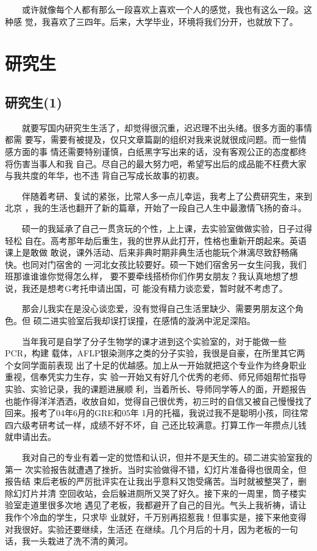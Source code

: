 \documentclass[12pt]{book}
\begin{document}
　　或许就像每个人都有那么一段喜欢上喜欢一个人的感觉，我也有这么一段。这种感
觉，我喜欢了三四年。后来，大学毕业，环境将我们分开，也就放下了。

\chapter{研究生}
\label{sec-5}
\section{研究生(1)}
\label{sec-5-1}
　　就要写国内研究生生活了，却觉得很沉重，迟迟理不出头绪。很多方面的事情都需
要写，需要有被提及，仅只文章篇副的组织对我来说就很成问题。而一些情感方面的事
情还需要特别谨慎，白纸黑字写出来的话，没有客观公正的态度都终将伤害当事人和我
自己。尽自己的最大努力吧，希望写出后的成品能不枉费大家与我共度的年华，也不违
背自己写成长故事的初衷。

　　伴随着考研、复试的紧张，比常人多一点儿幸运，我考上了公费研究生，来到北京
，我的生活也翻开了新的篇章，开始了一段自己人生中最激情飞扬的奋斗。

　　硕一的我延承了自己一贯贪玩的个性，上上课，去实验室做做实验，日子过得轻松
自在。高考那年劫后重生，我的世界从此打开，性格也重新开朗起来。英语课上是敢做
敢说，课外活动、后来非典时期非典生活也能玩个淋漓尽致舒畅痛快。也同对门宿舍的
一河北女孩比较要好。硕一下她们宿舍另一女生问我，我们班那谁谁谁你觉得怎么样，
要不要牵线搭桥你们作男女朋友？我认真地想了想说，我还是想考G考托申请出国，可
能没有精力谈恋爱，暂时就不考虑了。

　　那会儿我实在是没心谈恋爱，没有觉得自己生活里缺少、需要男朋友这个角色。但
硕二进实验室后我却误打误撞，在感情的漩涡中泥足深陷。

　　当年我可是自学了分子生物学的课才进到这个实验室的，对于能做一些PCR，构建
载体，AFLP银染测序之类的分子实验，我很是自豪，在所里其它两个女同学面前表现
出了十足的优越感。加上从一开始就把这个专业作为终身职业重视，信奉凭实力生存，实
验一开始又有好几个优秀的老师、师兄师姐帮忙指导实验、实验记录，我的课题进展顺
利，当着所长、导师同学等人的面，开题报告也能作得洋洋洒洒，收放自如，觉得自己很优秀，初三时的自信又被自己慢慢找了回来。报考了04年6月的GRE和05年
1月的托福，我说过我不是聪明小孩，同往常四六级考研考试一样，成绩不好不坏，自
己还比较满意。打算工作一年攒点儿钱就申请出去。

　　我对自己的专业有着一定的觉悟和认识，但并不是天生的。硕二进实验室我的第一
次实验报告就遭遇了挫折。当时实验做得不错，幻灯片准备得也很周全，但报告结
束后老板的严厉批评实在让我出乎意料又饱受痛苦。当时就被整哭了，删除幻灯片并清
空回收站，会后躲进厕所又哭了好久。接下来的一周里，筒子楼实验室走道里很多次地
遇见了老板，我都避开了自己的目光。气头上我祈祷，请让我作个冷血的学生，只求毕
业就好，千万别再招惹我！但事实是，接下来他变得对我很好。实验还要继续，生活还
在继续。几个月后的十月，因为老板的一句话，我一头栽进了洗不清的黄河。
\end{document}
